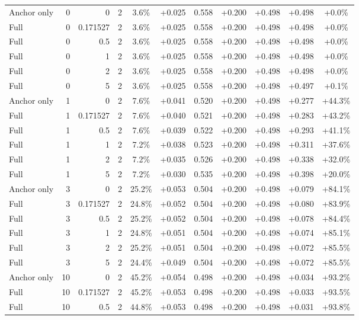 \begin{table}[htbp]
\begin{tabular}{lrrrccccccc}
Anchor only & 0 & 0 & 2 & 3.6\% & +0.025 & 0.558 & +0.200 & +0.498 & +0.498 & +0.0\% \\
Full & 0 & 0.171527 & 2 & 3.6\% & +0.025 & 0.558 & +0.200 & +0.498 & +0.498 & +0.0\% \\
Full & 0 & 0.5 & 2 & 3.6\% & +0.025 & 0.558 & +0.200 & +0.498 & +0.498 & +0.0\% \\
Full & 0 & 1 & 2 & 3.6\% & +0.025 & 0.558 & +0.200 & +0.498 & +0.498 & +0.0\% \\
Full & 0 & 2 & 2 & 3.6\% & +0.025 & 0.558 & +0.200 & +0.498 & +0.498 & +0.0\% \\
Full & 0 & 5 & 2 & 3.6\% & +0.025 & 0.558 & +0.200 & +0.498 & +0.497 & +0.1\% \\
Anchor only & 1 & 0 & 2 & 7.6\% & +0.041 & 0.520 & +0.200 & +0.498 & +0.277 & +44.3\% \\
Full & 1 & 0.171527 & 2 & 7.6\% & +0.040 & 0.521 & +0.200 & +0.498 & +0.283 & +43.2\% \\
Full & 1 & 0.5 & 2 & 7.6\% & +0.039 & 0.522 & +0.200 & +0.498 & +0.293 & +41.1\% \\
Full & 1 & 1 & 2 & 7.2\% & +0.038 & 0.523 & +0.200 & +0.498 & +0.311 & +37.6\% \\
Full & 1 & 2 & 2 & 7.2\% & +0.035 & 0.526 & +0.200 & +0.498 & +0.338 & +32.0\% \\
Full & 1 & 5 & 2 & 7.2\% & +0.030 & 0.535 & +0.200 & +0.498 & +0.398 & +20.0\% \\
Anchor only & 3 & 0 & 2 & 25.2\% & +0.053 & 0.504 & +0.200 & +0.498 & +0.079 & +84.1\% \\
Full & 3 & 0.171527 & 2 & 24.8\% & +0.052 & 0.504 & +0.200 & +0.498 & +0.080 & +83.9\% \\
Full & 3 & 0.5 & 2 & 25.2\% & +0.052 & 0.504 & +0.200 & +0.498 & +0.078 & +84.4\% \\
Full & 3 & 1 & 2 & 24.8\% & +0.051 & 0.504 & +0.200 & +0.498 & +0.074 & +85.1\% \\
Full & 3 & 2 & 2 & 25.2\% & +0.051 & 0.504 & +0.200 & +0.498 & +0.072 & +85.5\% \\
Full & 3 & 5 & 2 & 24.4\% & +0.049 & 0.504 & +0.200 & +0.498 & +0.072 & +85.5\% \\
Anchor only & 10 & 0 & 2 & 45.2\% & +0.054 & 0.498 & +0.200 & +0.498 & +0.034 & +93.2\% \\
Full & 10 & 0.171527 & 2 & 45.2\% & +0.053 & 0.498 & +0.200 & +0.498 & +0.033 & +93.5\% \\
Full & 10 & 0.5 & 2 & 44.8\% & +0.053 & 0.498 & +0.200 & +0.498 & +0.031 & +93.8\% \\

\end{tabular}
\end{table}
